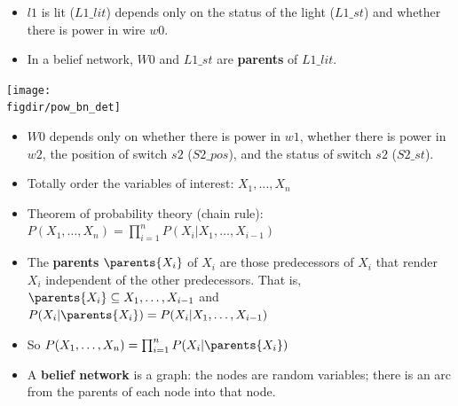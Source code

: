 \documentclass[12pt]{beamer} %
\newcommand{\figdir}{../../figures/ch06}
\begin{document}
\begin{slide}
\begin{minipage}[b]{0.5\textwidth}
\begin{itemize}
\item
 $l1$ is lit ($L1\_lit$) depends only on the status of the
light ($L1\_st$) and whether there is power in wire $w0$.
\item In a belief network, $W0$ and $L1\_st$ are \textbf{parents} of
  $L1\_lit$.
\end{itemize}
\end{minipage}%
\texttt{[image: \\figdir/pow\_bn\_det]}%

\begin{itemize}
\item $W0$ depends only on \pause whether there is power in $w1$,
whether there is power in $w2$, the position of switch $s2$
($S2\_pos$), and the status of switch $s2$ ($S2\_st$).
\end{itemize}

\end{slide}

\begin{slide}
\begin{itemize}
\item Totally order the variables of interest: $X_1,\dots,X_n$
\item Theorem of probability theory (chain rule):\\
$
P(X_1,\ldots,X_n) =\prod_{i=1}^n P(X_i|X_1,\dots,X_{i-1})
$
\item  The \textbf{parents} $\parents{X_i}$ of $X_i$ are those predecessors of $X_i$ that
render $X_i$ independent of the other predecessors. That is, \pause 
$\parents{X_i} \subseteq X_1,\dots,X_{i-1}$ and
$P(X_i|\parents{X_i}) = P(X_i|X_1,\dots,X_{i-1})$
\item So
$P(X_1,\ldots,X_n) = \prod_{i=1}^n P(X_i|\parents{X_i})$
\item A \textbf{belief network} is a graph: the nodes are random
variables; there is an arc from the parents of each node into that
node.
\end{itemize}
\end{slide}
\end{document}
